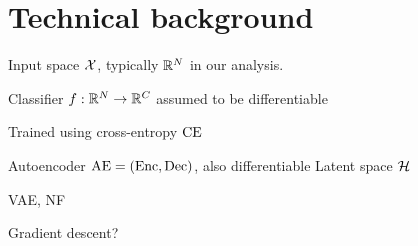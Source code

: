 \documentclass[../main.tex]{subfiles}
\begin{document}
\chapter{Technical background}
\label{ch:background}

Input space $\mathcal{X}$, typically $\mathbb{R}^N$ in our analysis.

Classifier $f: \mathbb{R}^N \to \mathbb{R}^C$ assumed to be differentiable

Trained using cross-entropy $\text{CE}$

Autoencoder $\mathrm{AE} = (\operatorname{Enc}, \operatorname{Dec})$, also differentiable
Latent space $\mathcal{H}$

VAE, NF

Gradient descent?
\end{document}
